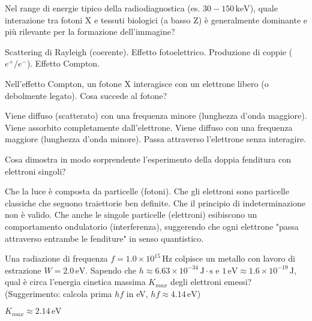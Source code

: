 \documentclass{exam}%
\begin{document}
\begin{questions}%
\question Nel range di energie tipico della radiodiagnostica (es. $30-150 \, \text{keV}$), quale interazione tra fotoni X e tessuti biologici (a basso Z) è generalmente dominante e più rilevante per la formazione dell'immagine?%
\vspace{0.2em}%
\begin{multicols}{2}%
\begin{choices}%
\choice Scattering di Rayleigh (coerente).%
\choice Effetto fotoelettrico.%
\choice Produzione di coppie ($e^+/e^-$).%
\choice Effetto Compton.%
\end{choices}%
\end{multicols}%
\question Nell'effetto Compton, un fotone X interagisce con un elettrone libero (o debolmente legato). Cosa succede al fotone?%
\vspace{0.2em}%
\begin{choices}%
\choice Viene diffuso (scatterato) con una frequenza minore (lunghezza d'onda maggiore).%
\choice Viene assorbito completamente dall'elettrone.%
\choice Viene diffuso con una frequenza maggiore (lunghezza d'onda minore).%
\choice Passa attraverso l'elettrone senza interagire.%
\end{choices}%
\question Cosa dimostra in modo sorprendente l'esperimento della doppia fenditura con elettroni singoli?%
\vspace{0.2em}%
\begin{choices}%
\choice Che la luce è composta da particelle (fotoni).%
\choice Che gli elettroni sono particelle classiche che seguono traiettorie ben definite.%
\choice Che il principio di indeterminazione non è valido.%
\choice Che anche le singole particelle (elettroni) esibiscono un comportamento ondulatorio (interferenza), suggerendo che ogni elettrone "passa attraverso entrambe le fenditure" in senso quantistico.%
\end{choices}%
\question Una radiazione di frequenza $f = 1.0 \times 10^{15} \, \text{Hz}$ colpisce un metallo con lavoro di estrazione $W = 2.0 \, \text{eV}$. Sapendo che $h \approx 6.63 \times 10^{-34} \, \text{J} \cdot \text{s}$ e $1 \, \text{eV} \approx 1.6 \times 10^{-19} \, \text{J}$, qual è circa l'energia cinetica massima $K_{max}$ degli elettroni emessi? (Suggerimento: calcola prima $hf$ in eV, $hf \approx 4.14 \, \text{eV}$)%
\vspace{0.2em}%
\begin{multicols}{4}%
\begin{choices}%
\choice $K_{max} \approx 2.14 \, \text{eV}$%

\end{choices}
\end{multicols}
\end{questions}
\end{document}
